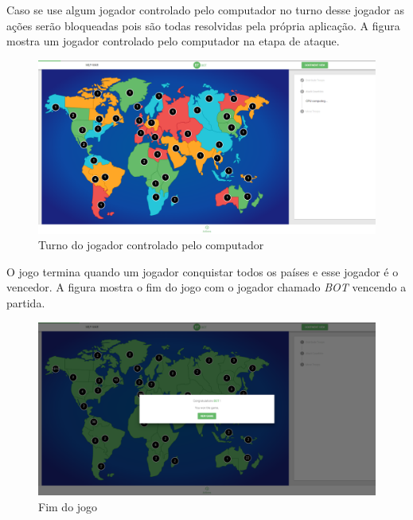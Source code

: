 \documentclass[rel_mlp]{iiufrgs}
\begin{document}
Caso se use algum jogador controlado pelo computador no turno desse jogador as ações serão bloqueadas pois são todas resolvidas pela própria aplicação.
A figura \label{fig:bot} mostra um jogador controlado pelo computador na etapa de ataque.

\begin{figure}[h!]
\centering
  \includegraphics[width=1.0\textwidth]{images/bot.png}
  \caption{Turno do jogador controlado pelo computador}
  \label{fig:bot}
\end{figure}

O jogo termina quando um jogador conquistar todos os países e esse jogador é o vencedor. 
A figura \label{fig:endGame} mostra o fim do jogo com o jogador chamado \textit{BOT} vencendo a partida.

\begin{figure}[h!]
\centering
  \includegraphics[width=1.0\textwidth]{images/endGame.png}
  \caption{Fim do jogo}
  \label{fig:endGame}
\end{figure}
\end{document}
